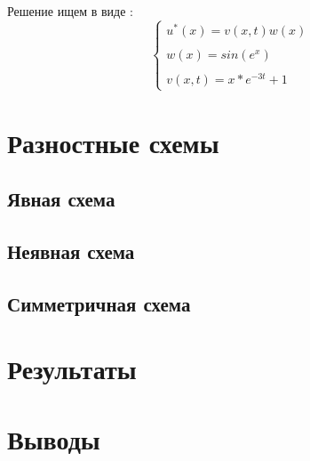 \documentclass[12pt]{article}
\begin{document}
Решение ищем в виде : 
$$
\begin{cases}
u^*(x) = v(x, t)w(x) \\ \\
w(x) = sin(e^x) \\ \\
v(x, t) = x*e^{-3t}+1
\end{cases}
$$ 
\section{Разностные схемы}
\subsection{Явная схема}

\subsection{Неявная схема}

\subsection{Симметричная схема}
\section{Результаты}

\section{Выводы}
\end{document}
